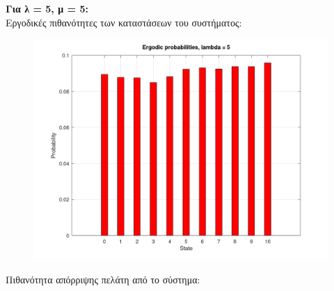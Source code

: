\documentclass[a4paper]{article}
\begin{document}
\begin{minipage}{\textwidth}

\textbf{Για λ = 5, μ = 5:} \\

Εργοδικές πιθανότητες των καταστάσεων του συστήματος:



\begin{figure}[H]
	\includegraphics[width=\textwidth]{images/prob2.png}
\end{figure}

Πιθανότητα απόρριψης πελάτη από το σύστημα:


\end{minipage}
\end{document}
